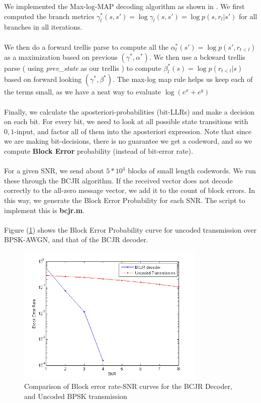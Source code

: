 \documentclass[paper=a4, fontsize=12pt]{scrartcl} %
\numberwithin{equation}{section} %
\numberwithin{figure}{section} %
\numberwithin{table}{section} %
\begin{document}
We implemented the Max-log-MAP decoding algorithm as shown in \cite{BCJR}. We first computed the branch metrics $\gamma^*_l(s,s')=\log \gamma_l(s,s') = \log p(s,r_l | s')$ for all branches in all iterations. 
\\ \\
We then do a forward trellis parse to compute all the $\alpha^*_l(s') = \log p(s', r_{t<l}) $ as a maximization based on previous $(\gamma^*,\alpha^*)$. We then use a bckward trellis parse ( using \textit{prev\_state} as our trellis ) to compute $\beta^*_l(s) = \log p(r_{t<l} | s)$ based on forward looking $(\gamma^*,\beta^*)$. The max-log map rule helps us keep each of the terms small, as we have a neat way to evaluate $\log(e^x + e^y)$
\\ \\
Finally, we calculate the aposteriori-probabilities (bit-LLRs) and make a decision on each bit. For every bit, we need to look at all possible state transitions  with $0,1$-input, and factor all of them into the aposteriori expression. Note that since we are making bit-decisions, there is no guarantee we get a codeword, and so we compute \textbf{Block Error} probability (instead of bit-error rate).
\\ \\
For a given SNR, we send about $5*10^4$ blocks of small length codewords. We run these through the BCJR algorithm. If the received vector does not decode correctly to the all-zero message vector, we add it to the count of block errors. In this way, we generate the Block Error Probability for each SNR. The script to implement this is \textbf{bcjr.m}.
\\ \\
Figure (\ref{ber}) shows the Block Error Probability curve for uncoded transmission over BPSK-AWGN, and that of the BCJR decoder. 
\pagebreak
\begin{figure}
\centering
\includegraphics[width=0.8\textwidth]{images/ber}
\caption{Comparison of Block error rate-SNR curves for the BCJR Decoder, and Uncoded BPSK transmission}
\label{ber}
\end{figure}
\end{document}
